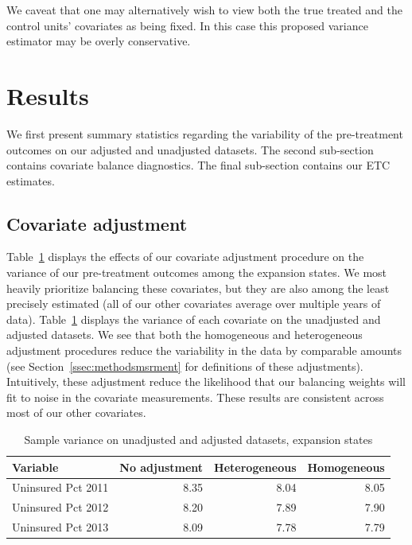 \documentclass[aoas]{imsart}
\theoremstyle{plain}
\theoremstyle{remark}
\begin{document}
We caveat that one may alternatively wish to view both the true treated and the control units' covariates as being fixed. In this case this proposed variance estimator may be overly conservative. 

\section{Results}\label{sec:results}

We first present summary statistics regarding the variability of the pre-treatment outcomes on our adjusted and unadjusted datasets. The second sub-section contains covariate balance diagnostics. The final sub-section contains our ETC estimates.

\subsection{Covariate adjustment}

Table~\ref{tab:adjust1} displays the effects of our covariate adjustment procedure on the variance of our pre-treatment outcomes among the expansion states. We most heavily prioritize balancing these covariates, but they are also among the least precisely estimated (all of our other covariates average over multiple years of data). Table~\ref{tab:adjust1} displays the variance of each covariate on the unadjusted and adjusted datasets. We see that both the homogeneous and heterogeneous adjustment procedures reduce the variability in the data by comparable amounts (see Section~\ref{ssec:methodsmsrment} for definitions of these adjustments). Intuitively, these adjustment reduce the likelihood that our balancing weights will fit to noise in the covariate measurements. These results are consistent across most of our other covariates.

\begin{table}[ht]
\caption{Sample variance on unadjusted and adjusted datasets, expansion states}\label{tab:adjust1}
\begin{tabular}{lrrr}
  \hline
Variable & No adjustment & Heterogeneous & Homogeneous \\ 
  \hline
Uninsured Pct 2011 & 8.35 & 8.04 & 8.05 \\ 
  Uninsured Pct 2012 & 8.20 & 7.89 & 7.90 \\ 
  Uninsured Pct 2013 & 8.09 & 7.78 & 7.79 \\ 
   \hline
\end{tabular}
\end{table}
\end{document}

